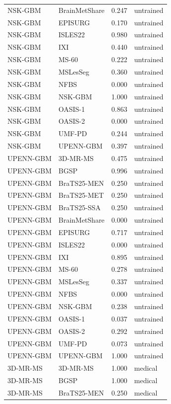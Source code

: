 \begin{tabular}{llrl}
NSK-GBM & BrainMetShare & 0.247 & untrained \\
NSK-GBM & EPISURG & 0.170 & untrained \\
NSK-GBM & ISLES22 & 0.980 & untrained \\
NSK-GBM & IXI & 0.440 & untrained \\
NSK-GBM & MS-60 & 0.222 & untrained \\
NSK-GBM & MSLesSeg & 0.360 & untrained \\
NSK-GBM & NFBS & 0.000 & untrained \\
NSK-GBM & NSK-GBM & 1.000 & untrained \\
NSK-GBM & OASIS-1 & 0.863 & untrained \\
NSK-GBM & OASIS-2 & 0.000 & untrained \\
NSK-GBM & UMF-PD & 0.244 & untrained \\
NSK-GBM & UPENN-GBM & 0.397 & untrained \\
UPENN-GBM & 3D-MR-MS & 0.475 & untrained \\
UPENN-GBM & BGSP & 0.996 & untrained \\
UPENN-GBM & BraTS25-MEN & 0.250 & untrained \\
UPENN-GBM & BraTS25-MET & 0.250 & untrained \\
UPENN-GBM & BraTS25-SSA & 0.250 & untrained \\
UPENN-GBM & BrainMetShare & 0.000 & untrained \\
UPENN-GBM & EPISURG & 0.717 & untrained \\
UPENN-GBM & ISLES22 & 0.000 & untrained \\
UPENN-GBM & IXI & 0.895 & untrained \\
UPENN-GBM & MS-60 & 0.278 & untrained \\
UPENN-GBM & MSLesSeg & 0.337 & untrained \\
UPENN-GBM & NFBS & 0.000 & untrained \\
UPENN-GBM & NSK-GBM & 0.238 & untrained \\
UPENN-GBM & OASIS-1 & 0.037 & untrained \\
UPENN-GBM & OASIS-2 & 0.292 & untrained \\
UPENN-GBM & UMF-PD & 0.073 & untrained \\
UPENN-GBM & UPENN-GBM & 1.000 & untrained \\
3D-MR-MS & 3D-MR-MS & 1.000 & medical \\
3D-MR-MS & BGSP & 1.000 & medical \\
3D-MR-MS & BraTS25-MEN & 0.250 & medical \\

\end{tabular}
